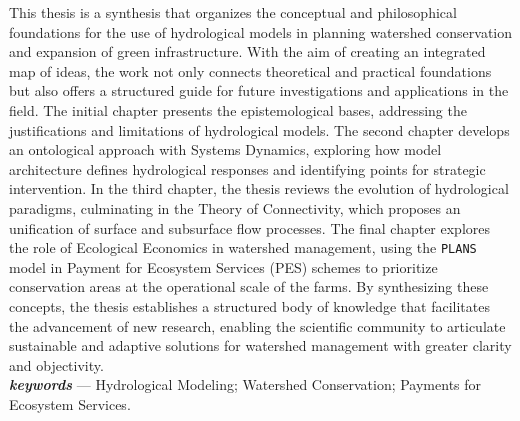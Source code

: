\documentclass[./main_en.tex]{subfiles}
\begin{document}
\large

\newpage
\renewcommand{\headrulewidth}{0pt}
\thispagestyle{fancy}
\fancyhf{} %
\fancyfoot{} %
\fancyfoot[C]{\thepage}

\large
\begin{center}
    \vspace{5mm}
\end{center}
\singlespacing
\normalsize
This thesis is a synthesis that organizes the conceptual and philosophical foundations for the use of hydrological models in planning watershed conservation and expansion of green infrastructure. With the aim of creating an integrated map of ideas, the work not only connects theoretical and practical foundations but also offers a structured guide for future investigations and applications in the field. The initial chapter presents the epistemological bases, addressing the justifications and limitations of hydrological models. The second chapter develops an ontological approach with Systems Dynamics, exploring how model architecture defines hydrological responses and identifying points for strategic intervention. In the third chapter, the thesis reviews the evolution of hydrological paradigms, culminating in the Theory of Connectivity, which proposes an unification of surface and subsurface flow processes. The final chapter explores the role of Ecological Economics in watershed management, using the \texttt{PLANS} model in Payment for Ecosystem Services (PES) schemes to prioritize conservation areas at the operational scale of the farms. By synthesizing these concepts, the thesis establishes a structured body of knowledge that facilitates the advancement of new research, enabling the scientific community to articulate sustainable and adaptive solutions for watershed management with greater clarity and objectivity.\\[2ex]
	
\noindent \textit{\textbf{keywords}} --- Hydrological Modeling; Watershed Conservation; Payments for Ecosystem Services.

\clearpage
\end{document}
